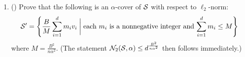 \documentclass{article}
\begin{document}
\begin{enumerate}[leftmargin=*,align=left]
\begin{enumerate}[leftmargin=*,align=left]
\begin{enumerate}[leftmargin=*,align=left]
\begin{enumerate}[leftmargin=*,align=left]
\vspace{5pt}
\item () Prove that the following is an $\alpha$-cover of ${\mathcal{S}}$ with respect to $\ell_2$-norm:
\[
{\mathcal{S}}' = \left\{\frac{B}{M}\sum_{i=1}^d m_i v_i \;\bigg\rvert\; \text{each $m_i$ is a nonnegative integer and $\sum_{i=1}^d m_i \leq M$}\right\}
\]
where $M = \frac{B^2}{n\alpha^2}$. 
(The statement ${\mathcal{N}}_2({\mathcal{S}}, \alpha) \leq d^{\frac{B^2}{n\alpha^2}}$ then follows immediately.) \\

\end{enumerate}
\end{enumerate}
\end{enumerate}


\end{enumerate}
\end{document}
